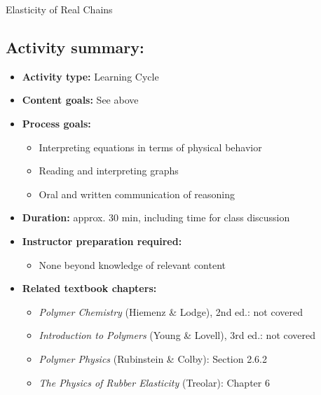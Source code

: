\begin{activity}[extension]{Elasticity of Real Chains}
\begin{instructornotes}
	\subsection*{Activity summary:}
	\begin{itemize}
		\item \textbf{Activity type:} Learning Cycle
		\item \textbf{Content goals:} See above
		\item \textbf{Process goals:} %
			\begin{itemize}
				\item Interpreting equations in terms of physical behavior
				\item Reading and interpreting graphs
				\item Oral and written communication of reasoning
			\end{itemize}
		\item \textbf{Duration:} approx. 30 min, including time for class discussion
		\item \textbf{Instructor preparation required:} 
			\begin{itemize}
				\item None beyond knowledge of relevant content
			\end{itemize}
		\item \textbf{Related textbook chapters:}
			\begin{itemize}
				\item \emph{Polymer Chemistry} (Hiemenz \& Lodge), 2nd ed.: not covered
				\item \emph{Introduction to Polymers} (Young \& Lovell), 3rd ed.: not covered
				\item \emph{Polymer Physics} (Rubinstein \& Colby): Section 2.6.2
				\item \emph{The Physics of Rubber Elasticity} (Treolar): Chapter 6
			\end{itemize}
	\end{itemize}

\end{instructornotes}



\begin{model}
\label{\labelbase:model:chainstretching}


\end{model}
\end{activity}
